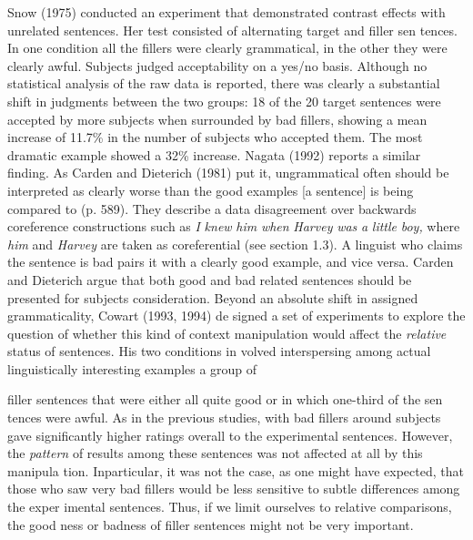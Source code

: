 \begin{styleTextbody}
Snow (1975) conducted an experiment that demonstrated contrast effects with unrelated sentences. Her test consisted of alternating target and filler sen\- tences. In one condition all the fillers were clearly grammatical, in the other they were clearly awful. Subjects judged acceptability on a yes/no basis. Although no statistical analysis of the raw data is reported, there was clearly a substantial shift in judgments between the two groups: 18 of the 20 target sentences were accepted by more subjects when surrounded by bad fillers, showing a mean increase of 11.7\% in the number of subjects who accepted them. The most dramatic example showed a 32\% increase. Nagata (1992) reports a similar finding. As Carden and Dieterich (1981) put it, {\textquotesingle}{\textquotedbl}ungrammatical{\textquotesingle} often should be interpreted as {\textquotesingle}clearly worse than the {\textquotedbl}good{\textquotedbl} examples [a sentence] is being compared to{\textquotesingle}{\textquotedbl} (p. 589). They describe a data disagreement over backwards coreference constructions such as \textit{I}\textit{ }\textit{knew}\textit{ }\textit{him}\textit{ }\textit{when}\textit{ }\textit{Harvey}\textit{ }\textit{was}\textit{ }\textit{a}\textit{ }\textit{little}\textit{ }\textit{boy,}\textit{ }where \textit{him}\textit{ }and \textit{Harvey}\textit{ }are taken as coreferential (see section 1.3). A linguist who claims the sentence is bad pairs it with a clearly good example, and vice versa. Carden and Dieterich argue that both good and bad related sentences should be presented for subjects{\textquotesingle} consideration. Beyond an absolute shift in assigned grammaticality, Cowart (1993, 1994) de\- signed a set of experiments to explore the question of whether this kind of context manipulation would affect the \textit{relative}\textit{ }status of sentences. His two conditions in\- volved interspersing among actual linguistically interesting examples a group of
\end{styleTextbody}


\clearpage\setcounter{page}{1}\begin{styleStandard}
filler sentences that were either all quite good or in which one-third of the sen\- tences were awful. As in the previous studies, with bad fillers around subjects gave significantly higher ratings overall to the experimental sentences. However, the \textit{pattern}\textit{ }of results among these sentences was not affected at all by this manipula\- tion. Inparticular, it was not the case, as one might have expected, that those who saw very bad fillers would be less sensitive to subtle differences among the exper\- imental sentences. Thus, if we limit ourselves to relative comparisons, the good\- ness or badness of filler sentences might not be very important.
\end{styleStandard}


